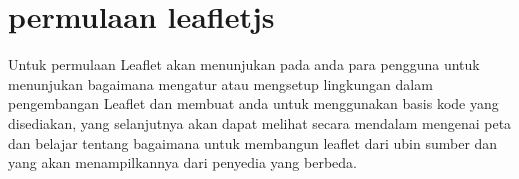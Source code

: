 \section{permulaan leafletjs}
Untuk permulaan Leaflet akan menunjukan pada anda para pengguna untuk menunjukan bagaimana mengatur atau mengsetup lingkungan dalam pengembangan Leaflet dan membuat anda untuk menggunakan basis kode yang disediakan, yang selanjutnya akan dapat melihat secara mendalam mengenai peta dan belajar tentang bagaimana untuk membangun leaflet dari ubin sumber dan yang akan menampilkannya dari penyedia yang berbeda.
